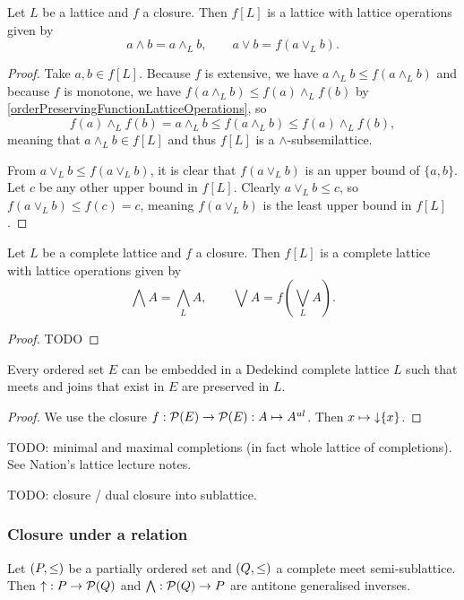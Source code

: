 \begin{proposition}
Let $L$ be a lattice and $f$ a closure. Then $f[L]$ is a lattice with lattice operations given by
\[ a\wedge b = a\wedge_L b, \qquad a\vee b = f(a\vee_L b). \]
\end{proposition}
\begin{proof}
Take $a,b\in f[L]$. Because $f$ is extensive, we have $a\wedge_L b \leq f(a\wedge_L b)$ and because $f$ is monotone, we have $f(a\wedge_L b)\leq f(a)\wedge_L f(b)$ by \ref{orderPreservingFunctionLatticeOperations}, so
\[ f(a)\wedge_L f(b) = a\wedge_L b \leq f(a\wedge_L b) \leq f(a)\wedge_L f(b), \]
meaning that $a\wedge_L b \in f[L]$ and thus $f[L]$ is a $\wedge$-subsemilattice.

From $a\vee_L b \leq f(a\vee_L b)$, it is clear that $f(a\vee_L b)$ is an upper bound of $\{a,b\}$. Let $c$ be any other upper bound in $f[L]$. Clearly $a\vee_L b \leq c$, so $f(a\vee_L b) \leq f(c) = c$, meaning $f(a\vee_L b)$ is the least upper bound in $f[L]$.
\end{proof}
\begin{proposition} \label{completeLatticeOperationsUnderClosure}
Let $L$ be a complete lattice and $f$ a closure. Then $f[L]$ is a complete lattice with lattice operations given by
\[ \bigwedge A = {\bigwedge}_L A, \qquad \bigvee A = f({\bigvee}_L A). \]
\end{proposition}
\begin{proof}
TODO
\end{proof}

\begin{theorem}
Every ordered set $E$ can be embedded in a Dedekind complete lattice $L$ such that meets and joins that exist in $E$ are preserved in $L$.
\end{theorem}
\begin{proof}
We use the closure $f: \operatorname{\mathcal{P}}(E) \to \operatorname{\mathcal{P}}(E): A\mapsto A^{ul}$. Then $x\mapsto \operatorname{\downarrow}\{x\}$.
\end{proof}

TODO: minimal and maximal completions (in fact whole lattice of completions). See Nation's lattice lecture notes.

TODO: closure / dual closure into sublattice.

\subsubsection{Closure under a relation}

\begin{proposition}
Let $\sSet{P, \leq}$ be a partially ordered set and $\sSet{Q, \leq}$ a complete meet semi-sublattice. Then $\operatorname{\uparrow}: P \to \operatorname{\mathcal{P}}(Q)$ and $\bigwedge: \operatorname{\mathcal{P}}(Q) \to P$ are antitone generalised inverses. 
\end{proposition}


